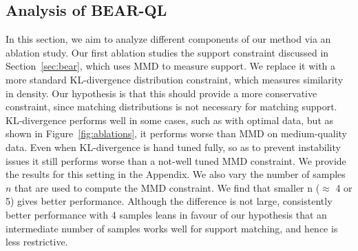 \subsection{Analysis of BEAR-QL}
\label{subsec:ablations}
In this section, we aim to analyze different components of our method via an ablation study. Our first ablation studies the support constraint discussed in Section~\ref{sec:bear}, which uses MMD to measure support. We replace it with a more standard KL-divergence distribution constraint, which measures similarity in density. 
Our hypothesis is that this should provide a more conservative constraint, since matching distributions is not necessary for matching support. KL-divergence performs well in some cases, such as with optimal data, but as shown in Figure~\ref{fig:ablations}, it performs worse than MMD on medium-quality data. Even when KL-divergence is hand tuned fully, so as to prevent instability issues it still performs worse than a not-well tuned MMD constraint. We provide the results for this setting in the Appendix. We also vary the number of samples $n$ that are used to compute the MMD constraint. We find that smaller n ($\approx$ 4 or 5) gives better performance. Although the difference is not large, consistently better performance with 4 samples leans in favour of our hypothesis that an intermediate number of samples works well for support matching, and hence is less restrictive.





